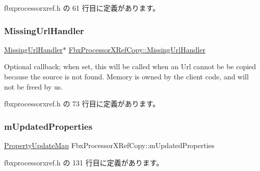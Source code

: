  fbxprocessorxref.\+h の 61 行目に定義があります。

\mbox{\label{class_fbx_processor_x_ref_copy_a13a7ad375e5d3abb72b393d005edd75e}} 
\subsubsection{\texorpdfstring{Missing\+Url\+Handler}{MissingUrlHandler}}
{\footnotesize\ttfamily \hyperlink{class_fbx_processor_x_ref_copy_1_1_missing_url_handler}{Missing\+Url\+Handler}$\ast$ \hyperlink{class_fbx_processor_x_ref_copy_1_1_missing_url_handler}{Fbx\+Processor\+X\+Ref\+Copy\+::\+Missing\+Url\+Handler}}

Optional callback; when set, this will be called when an Url cannot be be copied because the source is not found. Memory is owned by the client code, and will not be freed by us. 

 fbxprocessorxref.\+h の 73 行目に定義があります。

\mbox{\label{class_fbx_processor_x_ref_copy_ac42ed09834ba503d47e328d8c9734131}} 
\subsubsection{\texorpdfstring{m\+Updated\+Properties}{mUpdatedProperties}}
{\footnotesize\ttfamily \hyperlink{class_fbx_processor_x_ref_copy_af0408f51b60aa6c9fb8aab6e73f57eb7}{Property\+Update\+Map} Fbx\+Processor\+X\+Ref\+Copy\+::m\+Updated\+Properties\hspace{0.3cm}{\ttfamily [protected]}}



 fbxprocessorxref.\+h の 131 行目に定義があります。

\mbox{\label{class_fbx_processor_x_ref_copy_ae6b30eabb327bb56e3e2cf5b7b829e29}} 
